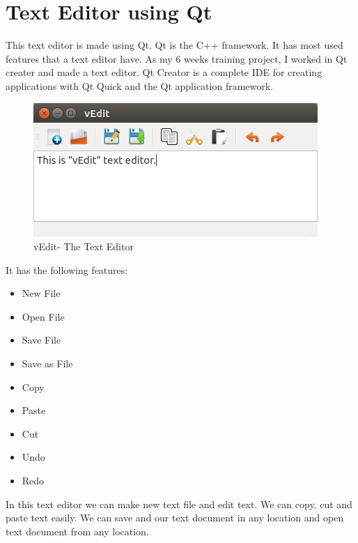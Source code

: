 \section{Text Editor using Qt}
This text editor is made using Qt. Qt is the C++ framework. It has most used features that a text editor have. 
\noindent As my 6 weeks training project,  I worked  in Qt creater and made a text editor.
Qt Creator is a complete IDE for creating applications with Qt Quick and the Qt application framework.
\begin{figure}[h]
\begin{center}
\includegraphics[scale=0.7]{images/vedit.png}
\caption{vEdit- The Text Editor}
\end{center}
\end{figure}

It has the following features:
\begin{itemize}
\item New File
\item Open File
\item Save File
\item Save as File
\item Copy
\item Paste
\item Cut
\item Undo
\item Redo
\end{itemize}

In this text editor we can make new text file and edit text. We can copy, cut and paste text easily. We can save and our text document in any location and open text document from any location. 

